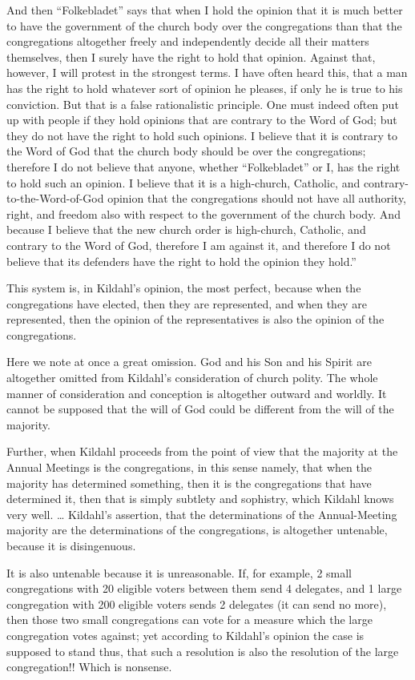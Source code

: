 {And then “Folkebladet” says that when I hold the opinion that it is much better to have the government of the church body over the congregations than that the congregations altogether freely and independently decide all their matters themselves, then I surely have the right to hold that opinion. Against that, however, I will protest in the strongest terms. I have often heard this, that a man has the right to hold whatever sort of opinion he pleases, if only he is true to his conviction. But that is a false rationalistic principle. One must indeed often put up with people if they hold opinions that are contrary to the Word of God; but they do not have the right to hold such opinions. I believe that it is contrary to the Word of God that the church body should be over the congregations; therefore I do not believe that anyone, whether “Folkebladet” or I, has the right to hold such an opinion. I believe that it is a high-church, Catholic, and contrary-to-the-Word-of-God opinion that the congregations should not have all authority, right, and freedom also with respect to the government of the church body. And because I believe that the new church order is high-church, Catholic, and contrary to the Word of God, therefore I am against it, and therefore I do not believe that its defenders have the right to hold the opinion they hold.”
}

This system is, in Kildahl’s opinion, the most perfect, because when the congregations have elected, then they are represented, and when they are represented, then the opinion of the representatives is also the opinion of the congregations.

Here we note at once a great omission. God and his Son and his Spirit are altogether omitted from Kildahl’s consideration of church polity. The whole manner of consideration and conception is altogether outward and worldly. It cannot be supposed that the will of God could be different from the will of the majority.

Further, when Kildahl proceeds from the point of view that the majority at the Annual Meetings is the congregations, in this sense namely, that when the majority has determined something, then it is the congregations that have determined it, then that is simply subtlety and sophistry, which Kildahl knows very well. … Kildahl’s assertion, that the determinations of the Annual-Meeting majority are the determinations of the congregations, is altogether untenable, because it is disingenuous.

It is also untenable because it is unreasonable. If, for example, 2 small congregations with 20 eligible voters between them send 4 delegates, and 1 large congregation with 200 eligible voters sends 2 delegates (it can send no more), then those two small congregations can vote for a measure which the large congregation votes against; yet according to Kildahl’s opinion the case is supposed to stand thus, that such a resolution is also the resolution of the large congregation!! Which is nonsense.

